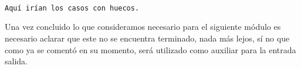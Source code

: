 {\codesize
\begin{verbatim}

Aquí irían los casos con huecos.

\end{verbatim}
}

Una vez concluido lo que consideramos necesario para el siguiente módulo es necesario aclarar que este no se encuentra terminado, nada más lejos, sí no que como ya se comentó en su momento, será utilizado como auxiliar para la entrada salida.
